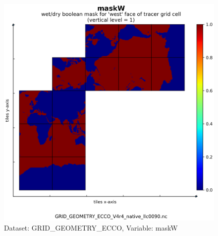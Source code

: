\begin{figure}[H]
\centering
\includegraphics[scale=0.55]{../images/plots/native_plots_coords/Geometry_Parameters_for_the_Lat-Lon-Cap_90_(llc90)_Native_Model_Grid_(Version_4_Release_4)/maskW.png}
\caption{Dataset: GRID\_GEOMETRY\_ECCO, Variable: maskW}
\label{tab:table-GRID_GEOMETRY_ECCO_maskW-Plot}
\end{figure}
\newpage
\pagebreak
